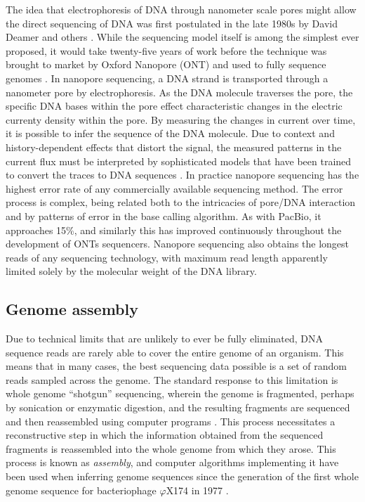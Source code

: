 The idea that electrophoresis of DNA through nanometer scale pores might allow the direct sequencing of DNA was first postulated in the late 1980s by David Deamer and others \cite{deamer2016three}.
While the sequencing model itself is among the simplest ever proposed, it would take twenty-five years of work \cite{kasianowicz1996characterization,purnell2008nucleotide} before the technique was brought to market by Oxford Nanopore (ONT) \cite{mikheyev2014first} and used to fully sequence genomes \cite{loman2015complete, jain2018nanopore}.
In nanopore sequencing, a DNA strand is transported through a nanometer pore by electrophoresis.
As the DNA molecule traverses the pore, the specific DNA bases within the pore effect characteristic changes in the electric currenty density within the pore.
By measuring the changes in current over time, it is possible to infer the sequence of the DNA molecule.
Due to context and history-dependent effects that distort the signal, the measured patterns in the current flux must be interpreted by sophisticated models that have been trained to convert the traces to DNA sequences \cite{david2016nanocall}.
In practice nanopore sequencing has the highest error rate of any commercially available sequencing method.
The error process is complex, being related both to the intricacies of pore/DNA interaction and by patterns of error in the base calling algorithm.
As with PacBio, it approaches 15\%, and similarly this has improved continuously throughout the development of ONTs sequencers.
Nanopore sequencing also obtains the longest reads of any sequencing technology, with maximum read length apparently limited solely by the molecular weight of the DNA library.


\subsection{Genome assembly}
\label{sec:genome_assembly}

Due to technical limits that are unlikely to ever be fully eliminated, DNA sequence reads are rarely able to cover the entire genome of an organism.
This means that in many cases, the best sequencing data possible is a set of random reads sampled across the genome. 
The standard response to this limitation is whole genome ``shotgun'' sequencing, wherein the genome is fragmented, perhaps by sonication or enzymatic digestion, and the resulting fragments are sequenced and then reassembled using computer programs \cite{gardner1981complete, sanger1982nucleotide}.
This process necessitates a reconstructive step in which the information obtained from the sequenced fragments is reassembled into the whole genome from which they arose.
This process is known as \emph{assembly}, and computer algorithms implementing it have been used when inferring genome sequences since the generation of the first whole genome sequence for bacteriophage $\varphi$X174 in 1977 \cite{sanger1977nucleotide, staden1979strategy}.

